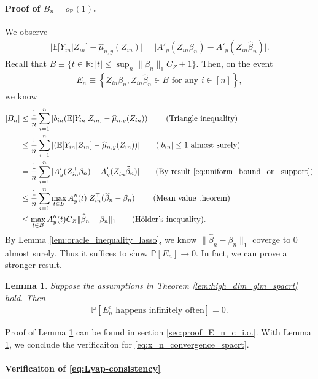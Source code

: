 \documentclass[12pt]{article}
\newtheorem{lemma}{Lemma}
\theoremstyle{definition}
\def\P{\mathbb{P}}
\def\P{\mathbb{P}}
\newcommand{\E}{\mathbb E}								%
\renewcommand{\P}{\mathbb{P}}							%
\newcommand{\srz}{Z}									%
\newcommand{\sry}{Y}									%
\begin{document}
\paragraph{Proof of $B_n=o_{\P}(1)$.}
We observe
\begin{align}\label{eq:uniform_bound_on_support}
  |\E[Y_{in}|\srz_{in}]-\widehat{\mu}_{n,y}(\srz_{in})|=|A'_y(\srz_{in}^\top\beta_n)-A'_y(\srz_{in}^\top \widehat \beta_n)|.
\end{align}
Recall that $B\equiv \{t\in\mathbb{R}:|t|\leq \sup_n\|\beta_n\|_1C_Z + 1\}$. Then, on the event 
\begin{align}\label{eq:magnitude_predictor}
  E_n\equiv \left\{\srz_{in}^\top\beta_n,\srz_{in}^\top \widehat \beta_n\in B\text{ for any }i\in[n]\right\},
\end{align}
we know
\begin{align*}
  |B_n|
  &
  \leq\frac{1}{n}\sum_{i=1}^n |b_{in}(\E[\sry_{in}|\srz_{in}]-\widehat{\mu}_{n,y}(\srz_{in}))|\tag{Triangle inequality}\\
  &
  \leq\frac{1}{n}\sum_{i=1}^n |(\E[\sry_{in}|\srz_{in}]-\widehat{\mu}_{n,y}(\srz_{in}))|\tag{$|b_{in}|\leq 1$ almost surely}\\
  &
  = \frac{1}{n}\sum_{i=1}^n|A'_y(\srz_{in}^\top\beta_n)-A'_y(\srz_{in}^\top \widehat \beta_n)|\tag{By result \eqref{eq:uniform_bound_on_support}}\\
  &
  \leq \frac{1}{n}\sum_{i=1}^n\max_{t\in B}A''_y(t)|\srz_{in}^\top(\widehat{\beta}_n-\beta_n)|\tag{Mean value theorem}\\
  &
  \leq \max_{t\in B}A''_y(t)C_Z\|\widehat{\beta}_n-\beta_n\|_1\tag{H\"older's inequality}.
\end{align*}
By Lemma \ref{lem:oracle_inequality_lasso}, we know $\|\widehat{\beta}_n-\beta_n\|_1$ coverge to $0$ almost surely. Thus it suffices to show $\P[E_n]\rightarrow0$. In fact, we can prove a stronger result.
\begin{lemma}\label{lem:E_n_c_i.o.}
  Suppose the assumptions in Theorem \ref{lem:high_dim_glm_spacrt} hold. Then
  \begin{align*}
    \P[E_n^c \text{ happens infinitely often}]=0.
  \end{align*}
\end{lemma}
\noindent Proof of Lemma \ref{lem:E_n_c_i.o.} can be found in section \ref{sec:proof_E_n_c_i.o.}. With Lemma \ref{lem:E_n_c_i.o.}, we conclude the verificaiton for \eqref{eq:x_n_convergence_spacrt}. 

\paragraph{Verificaiton of \eqref{eq:Lyap-consistency}}
\end{document}
